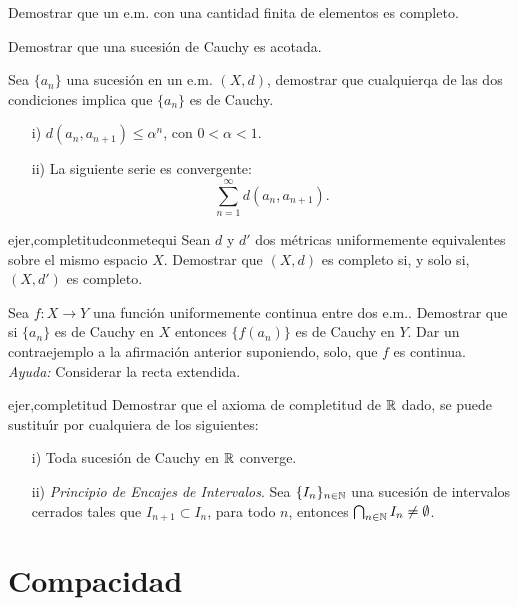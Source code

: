 \begin{ejercicio}{} Demostrar que un e.m. con una cantidad finita de
elementos es completo.
\end{ejercicio}

\begin{ejercicio}{} Demostrar que una sucesión de Cauchy es
acotada.
\end{ejercicio}

\begin{ejercicio}{} Sea $\{a_n\}$ una sucesión en un e.m. $(X,d)$,
demostrar que cualquierqa de las dos condiciones implica que
$\{a_n\}$ es de Cauchy.
\begin{itemize}
    \item[i)] $d(a_n,a_{n+1})\leq \alpha^n$, con $0<\alpha<1$.
    \item[ii)] La siguiente serie es convergente:
    \[
        \sum\limits_{n=1}^{\infty}d(a_n,a_{n+1}).
    \]
\end{itemize}
\end{ejercicio}

\begin{ejercicio}{ejer,completitudconmetequi} Sean $d$ y $d'$ dos métricas
 uniformemente equivalentes
sobre el mismo espacio $X$. Demostrar que $(X,d)$ es completo si,
y solo si, $(X,d')$ es completo.
\end{ejercicio}

\begin{ejercicio}{} Sea $f:X\to Y$ una función uniformemente
continua entre dos e.m.. Demostrar que si $\{a_n\}$ es de Cauchy
en $X$ entonces $\{f(a_n)\}$ es de Cauchy en $Y$. Dar un
contraejemplo a la afirmación anterior suponiendo, solo, que $f$
es continua. \emph{Ayuda:} Considerar la recta extendida.
\end{ejercicio}


\begin{ejercicio}{ejer,completitud} Demostrar que el axioma de completitud de $\mathbb{R}$
dado, se puede sustitu\'{\i}r por cualquiera de los siguientes:
\begin{itemize}
    \item[i)] Toda sucesión de Cauchy en $\mathbb{R}$ converge.
    \item[ii)] \emph{Principio de Encajes de Intervalos}. Sea
    $\{I_n\}_{n\in\mathbb{N}}$ una sucesión de intervalos cerrados
    tales que $I_{n+1}\subset I_n$, para todo $n$, entonces
    $\bigcap_{n\in\mathbb{N}}I_n\neq\emptyset$.
\end{itemize}
\end{ejercicio}
% 
% 
\section{Compacidad}

